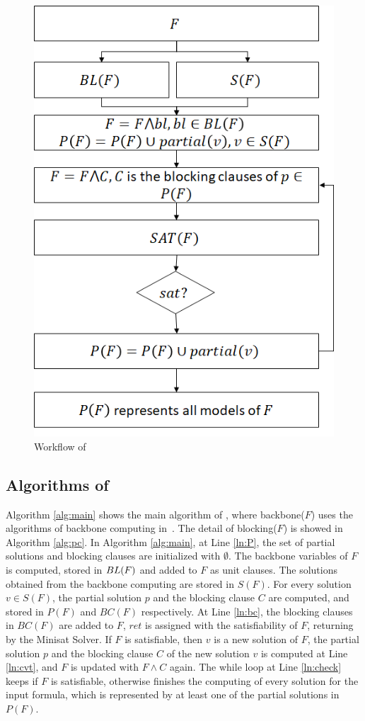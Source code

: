 \begin{figure}
    \centering
    \includegraphics[scale=0.4]{workflow.png}
    \caption{Workflow of \tool}
    \label{fig:overflow}
\end{figure}

\subsection{Algorithms of \tool}
Algorithm \ref{alg:main} shows the main algorithm of \tool, where backbone($F$) uses the algorithms of backbone computing in~\cite{bb}.
The detail of blocking($F$) is showed in Algorithm \ref{alg:pc}.
In Algorithm \ref{alg:main}, at Line \ref{ln:P}, the set of partial solutions and blocking clauses are initialized with $\emptyset$. The backbone variables of $F$ is computed, stored in ${\sc BL}(F)$ and added to $F$ as unit clauses. The solutions obtained from the backbone computing are stored in $S(F)$.
For every solution $v\in S(F)$, the partial solution $p$ and the blocking clause $C$ are computed, and stored in $P(F)$ and $BC(F)$ respectively. 
At Line \ref{ln:bc}, the blocking clauses in $BC(F)$ are added to $F$, $ret$ is assigned with the satisfiability of $F$, returning by the Minisat Solver. If $F$ is satisfiable, then $v$ is a new solution of $F$, the partial solution $p$ and the blocking clause $C$ of the new solution $v$ is computed at Line \ref{ln:cvt}, and $F$ is updated with $F\wedge C$ again. The while loop at Line \ref{ln:check} keeps if $F$ is satisfiable, otherwise \tool finishes the computing of every solution for the input formula, which is represented by at least one of the partial solutions in $P(F)$.

